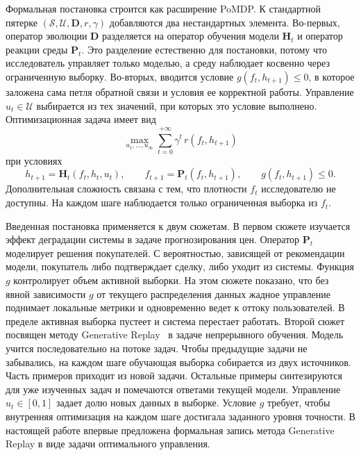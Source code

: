\documentclass[a4paper,14pt,oneside,openany]{extarticle}
\newcommand{\bD}{\mathbf{D}}
\newcommand{\bH}{\mathbf{H}}
\newcommand{\bP}{\mathbf{P}}
\newcommand{\cS}{\mathcal{S}}
\newcommand{\cU}{\mathcal{U}}
\begin{document}
Формальная постановка строится как расширение PoMDP. К стандартной пятерке $(\cS, \cU, \bD, r, \gamma)$ добавляются два нестандартных элемента. Во-первых, оператор эволюции $\bD$ разделяется на оператор обучения модели $\bH_t$ и оператор реакции среды $\bP_t$. Это разделение естественно для постановки, потому что исследователь управляет только моделью, а среду наблюдает косвенно через ограниченную выборку. Во-вторых, вводится условие $g(f_t, h_{t+1}) \leq 0$, в которое заложена сама петля обратной связи и условия ее корректной работы. Управление $u_t \in \cU$ выбирается из тех значений, при которых это условие выполнено. Оптимизационная задача имеет вид
\begin{equation*}
    \max_{u_1, \ldots, u_\infty} \sum_{t=0}^{+\infty} \gamma^t\, r(f_t, h_{t+1})
\end{equation*}
при условиях
\begin{equation*}
    h_{t+1} = \bH_t(f_t, h_t, u_t), \qquad f_{t+1} = \bP_t(f_t, h_{t+1}), \qquad g(f_t, h_{t+1}) \leq 0.
\end{equation*}
Дополнительная сложность связана с тем, что плотности $f_t$ исследователю не доступны. На каждом шаге наблюдается только ограниченная выборка из $f_t$.

Введенная постановка применяется к двум сюжетам. В первом сюжете изучается эффект деградации системы в задаче прогнозирования цен. Оператор $\bP_t$ моделирует решения покупателей. С вероятностью, зависящей от рекомендации модели, покупатель либо подтверждает сделку, либо уходит из системы. Функция $g$ контролирует объем активной выборки. На этом сюжете показано, что без явной зависимости $g$ от текущего распределения данных жадное управление поднимает локальные метрики и одновременно ведет к оттоку пользователей. В пределе активная выборка пустеет и система перестает работать.
Второй сюжет посвящен методу Generative Replay~\cite{shin2017continual} в задаче непрерывного обучения. Модель учится последовательно на потоке задач. Чтобы предыдущие задачи не забывались, на каждом шаге обучающая выборка собирается из двух источников. Часть примеров приходит из новой задачи. Остальные примеры синтезируются для уже изученных задач и помечаются ответами текущей модели. Управление $u_t \in [0, 1]$ задает долю новых данных в выборке. Условие $g$ требует, чтобы внутренняя оптимизация на каждом шаге достигала заданного уровня точности. В настоящей работе впервые предложена формальная запись метода Generative Replay в виде задачи оптимального управления.
\end{document}
